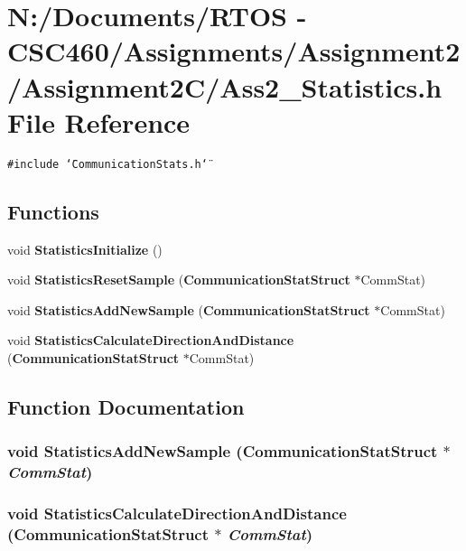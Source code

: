 \section{N:/Documents/RTOS - CSC460/Assignments/Assignment2/Assignment2C/Ass2\_\-Statistics.h File Reference}
\label{_ass2___statistics_8h}
{\tt \#include \char`\"{}Communication\-Stats.h\char`\"{}}\par
\subsection*{Functions}
\begin{CompactItemize}
\item 
void {\bf Statistics\-Initialize} ()
\item 
void {\bf Statistics\-Reset\-Sample} ({\bf Communication\-Stat\-Struct} $\ast$Comm\-Stat)
\item 
void {\bf Statistics\-Add\-New\-Sample} ({\bf Communication\-Stat\-Struct} $\ast$Comm\-Stat)
\item 
void {\bf Statistics\-Calculate\-Direction\-And\-Distance} ({\bf Communication\-Stat\-Struct} $\ast$Comm\-Stat)
\end{CompactItemize}


\subsection{Function Documentation}
\subsubsection{\setlength{\rightskip}{0pt plus 5cm}void Statistics\-Add\-New\-Sample ({\bf Communication\-Stat\-Struct} $\ast$ {\em Comm\-Stat})}\label{_ass2___statistics_8h_d0c0a6dacbe926df8eaa23f8d7ab2b76}


\subsubsection{\setlength{\rightskip}{0pt plus 5cm}void Statistics\-Calculate\-Direction\-And\-Distance ({\bf Communication\-Stat\-Struct} $\ast$ {\em Comm\-Stat})}\label{_ass2___statistics_8h_b1fc20883be14a3599efa947b55d5d0a}


